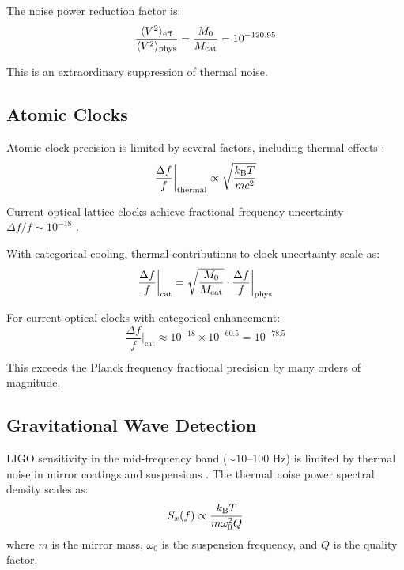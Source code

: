 The noise power reduction factor is:
\begin{equation}
\frac{\langle V^2 \rangle_{\text{eff}}}{\langle V^2 \rangle_{\text{phys}}} = \frac{M_0}{M_{\mathrm{cat}}} = 10^{-120.95}
\end{equation}

This is an extraordinary suppression of thermal noise.

\subsection{Atomic Clocks}

Atomic clock precision is limited by several factors, including thermal effects \cite{ludlow2015}:
\begin{equation}
\frac{\Delta f}{f}\bigg|_{\text{thermal}} \propto \sqrt{\frac{k_{\mathrm{B}} T}{mc^2}}
\end{equation}

Current optical lattice clocks achieve fractional frequency uncertainty $\Delta f/f \sim 10^{-18}$ \cite{mcgrew2018,brewer2019}.

\begin{theorem}
\label{thm:clock_precision}
With categorical cooling, thermal contributions to clock uncertainty scale as:
\begin{equation}
\frac{\Delta f}{f}\bigg|_{\text{cat}} = \sqrt{\frac{M_0}{M_{\mathrm{cat}}}} \cdot \frac{\Delta f}{f}\bigg|_{\text{phys}}
\end{equation}
\end{theorem}

For current optical clocks with categorical enhancement:
\begin{equation}
\frac{\Delta f}{f}\bigg|_{\text{cat}} \approx 10^{-18} \times 10^{-60.5} = 10^{-78.5}
\end{equation}

This exceeds the Planck frequency fractional precision by many orders of magnitude.

\subsection{Gravitational Wave Detection}

LIGO sensitivity in the mid-frequency band ($\sim 10$--$100$ Hz) is limited by thermal noise in mirror coatings and suspensions \cite{abbott2016,adhikari2014}. The thermal noise power spectral density scales as:
\begin{equation}
S_x(f) \propto \frac{k_{\mathrm{B}} T}{m \omega_0^2 Q}
\end{equation}
where $m$ is the mirror mass, $\omega_0$ is the suspension frequency, and $Q$ is the quality factor.


